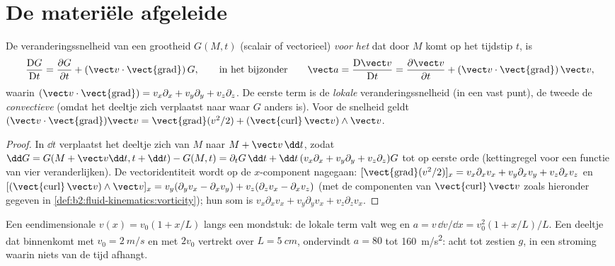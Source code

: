 \section{De materiële afgeleide}

\begin{theorem}\label{thm:b2:fluid-kinematics:material}
De veranderingssnelheid van een grootheid $G(M, t)$ (scalair of vectorieel)
\emph{voor het } dat door $M$ komt op het tijdstip $t$, is
\[
\frac{\mathrm DG}{\mathrm Dt} = \frac{\partial G}{\partial t} + (\vect v\cdot
\operatorname{\vect{grad}})\,G ,
\qquad\text{in het bijzonder}\qquad
\vect a = \frac{\mathrm D\vect v}{\mathrm Dt} = \frac{\partial\vect v}{\partial t} +
(\vect v\cdot\operatorname{\vect{grad}})\,\vect v ,
\]
waarin
$(\vect v\cdot\operatorname{\vect{grad}}) = v_x\partial_x + v_y\partial_y +
v_z\partial_z$.
De eerste term is de \emph{lokale} veranderingssnelheid (in een vast punt),
de tweede de \emph{convectieve} (omdat het deeltje zich verplaatst naar waar
$G$ anders is). Voor de snelheid geldt
$(\vect v\cdot
\operatorname{\vect{grad}})\vect v = \operatorname{\vect{grad}}(v^2/2) +
(\operatorname{\vect{curl}}\vect v)\wedge\vect v$.
\end{theorem}

\begin{proof}
In $\dd t$ verplaatst het deeltje zich van $M$ naar $M + \vect v\,\dd t$,
zodat
$\dd G =
G(M + \vect v\dd t, t + \dd t) - G(M, t) = \partial_tG\,\dd t + \dd t\,(v_x\partial_x
+ v_y\partial_y + v_z\partial_z)G$
tot op eerste orde (kettingregel voor een functie van vier veranderlijken).
De vectoridentiteit wordt op de $x$-component nagegaan:
$[\operatorname{\vect{grad}}(v^2/2)]_x = v_x\partial_xv_x + v_y\partial_x
v_y + v_z\partial_xv_z$
en
$[(\operatorname{\vect{curl}}\vect v)\wedge\vect v]_x =
v_y(\partial_yv_x - \partial_xv_y) + v_z(\partial_zv_x - \partial_xv_z)$
(met de componenten van $\operatorname{\vect{curl}}\vect v$ zoals hieronder
gegeven in \cref{def:b2:fluid-kinematics:vorticity}); hun som is
$v_x\partial_xv_x +
v_y\partial_yv_x + v_z\partial_zv_x$.
\end{proof}

\begin{example}\label{ex:b2:fluid-kinematics:nozzle}
Een eendimensionale  $v(x) = v_0(1 + x/L)$ langs een
mondstuk: de lokale term valt weg en
$a = v\,\dd v/\dd x = v_0^2(1 + x/L)/L$. Een deeltje dat binnenkomt met
$v_0 = \qty{2}{m/s}$ en met $2v_0$ vertrekt over $L
= \qty{5}{cm}$,
ondervindt $a = 80$ tot \qty{160}{m/s^2}: acht tot zestien $g$, in een
stroming waarin niets van de tijd afhangt.
\end{example}

